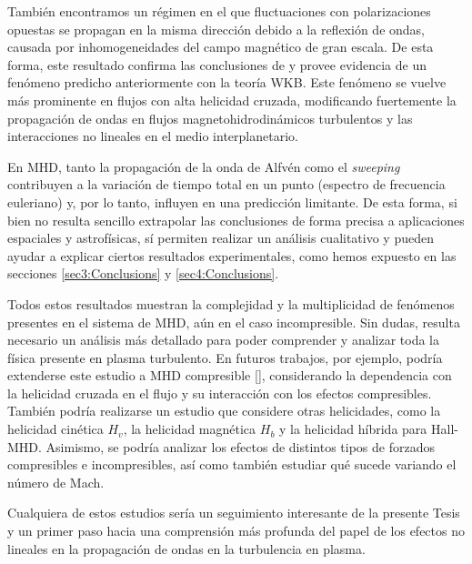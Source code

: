 También encontramos un régimen en el que fluctuaciones con
polarizaciones opuestas se propagan en la misma dirección debido a la
reflexión de ondas, causada por inhomogeneidades del campo magnético
de gran escala. De esta forma, este resultado confirma las
conclusiones de \cite{hollweg_1990_wkb} y provee evidencia de un
fenómeno predicho anteriormente con la teoría WKB. Este fenómeno se
vuelve más prominente en flujos con alta helicidad cruzada,
modificando fuertemente la propagación de ondas en flujos
magnetohidrodinámicos turbulentos y las interacciones no lineales en
el medio interplanetario.

\vspace{0.7cm}

En MHD, tanto la propagación de la onda de Alfvén como
el \textit{sweeping} contribuyen a la variación de tiempo total en un
punto (espectro de frecuencia euleriano) y, por lo tanto, influyen en
una predicción limitante. De esta forma, si bien no resulta sencillo
extrapolar las conclusiones de forma precisa a aplicaciones espaciales
y astrofísicas, sí permiten realizar un análisis cualitativo y pueden
ayudar a explicar ciertos resultados experimentales, como hemos
expuesto en las secciones \ref{sec3:Conclusions}
y \ref{sec4:Conclusions}.

Todos estos resultados muestran la complejidad y la multiplicidad de
fenómenos presentes en el sistema de MHD, aún en el caso
incompresible. Sin dudas, resulta necesario un análisis más detallado
para poder comprender y analizar toda la física presente en plasma
turbulento.  En futuros trabajos, por ejemplo, podría extenderse este
estudio a MHD compresible [\cite{andres_2017_interplay}], considerando
la dependencia con la helicidad cruzada en el flujo y su interacción
con los efectos compresibles. También podría realizarse un estudio que
considere otras helicidades, como la helicidad cinética $H_v$, la
helicidad magnética $H_b$ y la helicidad híbrida para
Hall-MHD. Asimismo, se podría analizar los efectos de distintos tipos
de forzados compresibles e incompresibles, así como también estudiar
qué sucede variando el número de Mach.

Cualquiera de estos estudios sería un seguimiento interesante de la
presente Tesis y un primer paso hacia una comprensión más profunda
del papel de los efectos no lineales en la propagación de ondas en la
turbulencia en plasma. 






